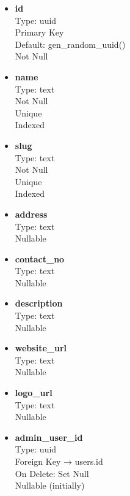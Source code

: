 \documentclass[12pt]{article}
\begin{document}
\begin{itemize}
    \item \textbf{id} \\
    Type: uuid \\
    Primary Key \\
    Default: gen\_random\_uuid() \\
    Not Null

    \item \textbf{name} \\
    Type: text \\
    Not Null \\
    Unique \\
    Indexed

    \item \textbf{slug} \\
    Type: text \\
    Not Null \\
    Unique \\
    Indexed

    \item \textbf{address} \\
    Type: text \\
    Nullable

    \item \textbf{contact\_no} \\
    Type: text \\
    Nullable

    \item \textbf{description} \\
    Type: text \\
    Nullable

    \item \textbf{website\_url} \\
    Type: text \\
    Nullable

    \item \textbf{logo\_url} \\
    Type: text \\
    Nullable

    \item \textbf{admin\_user\_id} \\
    Type: uuid \\
    Foreign Key → users.id \\
    On Delete: Set Null \\
    Nullable (initially)
\end{itemize}
\end{document}
